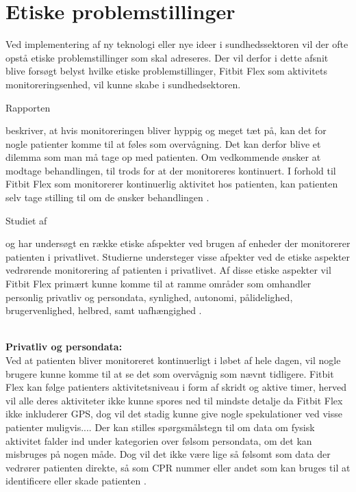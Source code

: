 \section{Etiske problemstillinger}

Ved implementering af ny teknologi eller nye ideer i sundhedssektoren vil der ofte opstå etiske problemstillinger som skal adreseres. Der vil derfor i dette afsnit blive forsøgt belyst hvilke etiske problemstillinger, Fitbit Flex som aktivitets monitoreringsenhed, vil kunne skabe i sundhedsektoren.

Rapporten \author{patienthome2015} beskriver, at hvis monitoreringen bliver hyppig og meget tæt på, kan det for nogle patienter komme til at føles som overvågning. Det kan derfor blive et dilemma som man må tage op med patienten. Om vedkommende ønsker at modtage behandlingen, til trods for at der monitoreres kontinuert. I forhold til Fitbit Flex som monitorerer kontinuerlig aktivitet hos patienten, kan patienten selv tage stilling til om de ønsker behandlingen \citep{patienthome2015, SundhedsstyrelsenPatientersRetsstilling2016}.

Studiet af \author{Mittelstand2011} og \citep{Nordgren2013} har undersøgt en række etiske afspekter ved brugen af enheder der monitorerer patienten i privatlivet. Studierne understeger visse afpekter ved de etiske aspekter vedrørende monitorering af patienten i privatlivet.%
Af disse etiske aspekter vil Fitbit Flex primært kunne komme til at ramme områder som omhandler personlig privatliv og persondata, synlighed, autonomi, pålidelighed, brugervenlighed, helbred, samt uafhængighed \citep{Mittelstand2011, Nordgren2013}.

\noindent \\
\textbf{Privatliv og persondata:}
\noindent \\
Ved at patienten bliver monitoreret kontinuerligt i løbet af hele dagen, vil nogle brugere kunne komme til at se det som overvågnig som nævnt tidligere. Fitbit Flex kan følge patienters aktivitetsniveau i form af skridt og aktive timer, herved vil alle deres aktiviteter ikke kunne spores ned til mindste detalje da Fitbit Flex ikke inkluderer GPS, dog vil det stadig kunne give nogle spekulationer ved visse patienter muligvis....
Der kan stilles spørgsmålstegn til om data om fysisk aktivitet falder ind under kategorien over følsom persondata, om det kan misbruges på nogen måde. Dog vil det ikke være lige så følsomt som data der vedrører patienten direkte, så som CPR nummer eller andet som kan bruges til at identificere eller skade patienten \citep{Mittelstand2011}.

